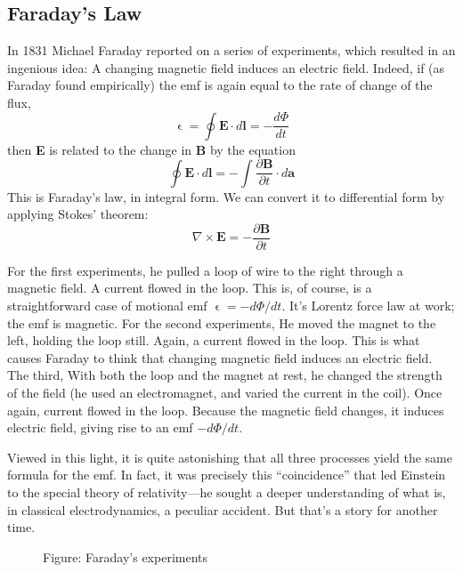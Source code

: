 \documentclass[../../../main.tex]{subfiles}
\begin{document}
\subsection{Faraday's Law}
In 1831 Michael Faraday reported on a series of experiments, which resulted in an ingenious idea: A changing magnetic ﬁeld induces an electric ﬁeld. Indeed, if (as Faraday found empirically) the emf is again equal to the rate of change of the ﬂux,
\begin{equation*}
    \upvarepsilon=\oint \mathbf{E}\cdot d\mathbf{l}=-\frac{d\Phi}{dt}
\end{equation*}
then \textbf{E} is related to the change in \textbf{B} by the equation
\begin{equation*}
    \oint \mathbf{E}\cdot d\mathbf{l}=-\int \frac{\partial \mathbf{B}}{\partial t}\cdot d\mathbf{a}
\end{equation*}
This is Faraday's law, in integral form. We can convert it to differential form by 
applying Stokes' theorem:
\begin{equation*}
    \nabla\times \mathbf{E}=-\frac{\partial \mathbf{B}}{\partial t}
\end{equation*}

For the first experiments, he pulled a loop of wire to the right through a magnetic ﬁeld. A current ﬂowed in the loop. This is, of course, is a straightforward case of motional emf $\upvarepsilon=-d\Phi/dt$. It’s  Lorentz force law at work; the emf is magnetic. For the second experiments, He moved the magnet to the left, holding the loop still. Again, a current ﬂowed in the loop. This is what causes Faraday to think that changing magnetic ﬁeld induces an electric ﬁeld. The third, With both the loop and the magnet at rest, he changed the strength of the ﬁeld (he used an electromagnet, and varied the current 
in the coil). Once again, current ﬂowed in the loop. Because the magnetic field changes, it induces electric field, giving rise to an emf $-d\Phi/dt$. 

Viewed in this light, it is quite astonishing that all three processes yield the same formula for the emf. In fact, it was precisely this “coincidence” that led Einstein to the special theory of relativity—he sought a deeper understanding of what is, in classical electrodynamics, a peculiar accident. But that’s a story for another time.
\begin{figure*}[b]
    \centering
    \caption*{Figure: Faraday's experiments}
\end{figure*}
\end{document}
